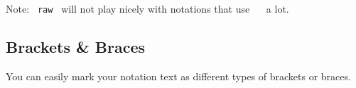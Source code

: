 \begin{Shaded}
\begin{Highlighting}[]


\end{Highlighting}
\end{Shaded}

Note: \texttt{\ raw\ } will not play nicely with notations that use
\texttt{\ \textasciigrave{}\ } a lot.

\subsection{Brackets \& Braces}\label{brackets-braces}

You can easily mark your notation text as different types of brackets or
braces.

